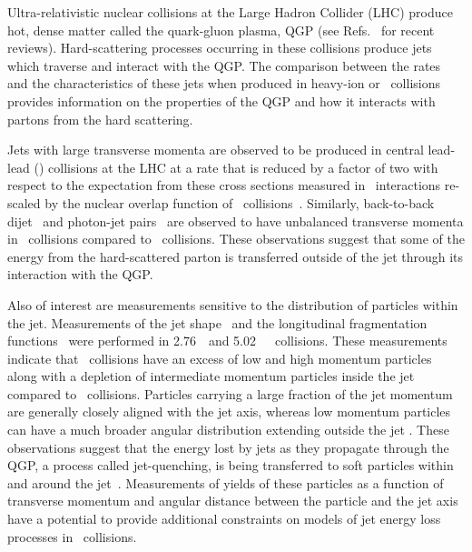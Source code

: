 
Ultra-relativistic nuclear collisions at the Large Hadron Collider (LHC) produce hot, dense matter
called the quark-gluon plasma, QGP (see Refs.~\cite{Roland:2014jsa,Busza:2018rrf} for recent reviews).
Hard-scattering processes occurring in these collisions produce jets which
traverse and interact with the QGP. The comparison between the rates and the characteristics of these jets when produced in heavy-ion or \pp\ collisions provides information on the properties of the QGP and how it interacts with partons from the hard scattering.

Jets with large transverse momenta are observed to be produced in central lead-lead (\pbpb) collisions at the LHC at a rate that is reduced by a factor of two with respect to the expectation from these cross sections measured in \pp\ interactions re-scaled by the nuclear overlap function of \pbpb\ collisions~\cite{Abelev:2013kqa,Aad:2014bxa,Khachatryan:2016jfl, 2019108}. 
Similarly, back-to-back dijet~\cite{Aad:2010bu,Chatrchyan:2011sx,Aaboud:2017eww} 
and photon-jet pairs~\cite{Chatrchyan:2012gt} are observed to have
unbalanced transverse momenta in \pbpb\ collisions compared to \pp\ collisions.
These observations suggest that some of the energy from the hard-scattered parton is
transferred outside of the jet through its interaction with the QGP.  

Also of interest are measurements sensitive to the distribution of particles
within the jet.  Measurements of the jet shape~\cite{Chatrchyan:2013kwa} and  the longitudinal fragmentation functions~\cite{Aad:2014wha,Chatrchyan:2014ava,Aaboud:2017bzv, PhysRevC.98.024908} were performed in 2.76~\TeV\ and 5.02~\TeV\ \pbpb\
collisions.
These measurements indicate that \pbpb\ collisions have an excess of low and high momentum particles along with a depletion of intermediate momentum particles inside the jet compared to \pp\ collisions. Particles carrying a large fraction of the jet momentum are generally closely
aligned with the jet axis, whereas low momentum particles can have a much broader
angular distribution extending outside the jet \cite{Khachatryan:2016tfj,Sirunyan:2018jqr}. 
These observations suggest that the energy lost by jets as they propagate through the QGP, a process called jet-quenching, is being transferred to soft particles within and around the jet~\cite{Qin:2015srf,Blaizot:2014ula}. Measurements of yields of these particles as a function of transverse momentum and
angular distance between the particle and the jet axis have a potential to provide additional constraints on models of jet energy loss processes in \pbpb\ collisions.

